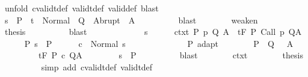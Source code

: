 \begin{isabellebody}
\ {\isacharparenleft}unfold\ cvalidt{\isacharunderscore}def\ validt{\isacharunderscore}def\ valid{\isacharunderscore}def{\isacharparenright}\ blast\isanewline
\ \ \ \ \ \ \isamarkupfalse%
\ {\isachardoublequoteopen}s\ {\isasymin}\ P{\isacharprime}\ {\isasymlongrightarrow}\ t\ {\isasymin}\ Normal\ {\isacharbackquote}\ Q{\isacharprime}\ {\isasymunion}\ Abrupt\ {\isacharbackquote}\ A{\isacharprime}{\isachardoublequoteclose}\isanewline
\ \ \ \ \ \ \ \ \isamarkupfalse%
\ blast\isanewline
\ \ \ \ \ \ \isamarkupfalse%
\ weaken\ \isanewline
\ \ \ \ \ \ \isamarkupfalse%
\ {\isacharquery}thesis\isanewline
\ \ \ \ \ \ \ \ \isamarkupfalse%
\ blast\isanewline
\ \ \ \ \isamarkupfalse%
\isanewline
\ \ \isamarkupfalse%
\isanewline
\ \ \ \ \isamarkupfalse%
\ s\isanewline
\ \ \ \ \isamarkupfalse%
\ ctxt{\isacharcolon}\ {\isachardoublequoteopen}{\isasymforall}{\isacharparenleft}P{\isacharcomma}\ p{\isacharcomma}\ Q{\isacharcomma}\ A{\isacharparenright}{\isasymin}{\isasymTheta}{\isachardot}\ {\isasymGamma}\ {\isasymTurnstile}\isactrlsub t\isactrlbsub {\isacharslash}F\isactrlesub \ P\ {\isacharparenleft}Call\ p{\isacharparenright}\ Q{\isacharcomma}A{\isachardoublequoteclose}\isanewline
\ \ \ \ \isamarkupfalse%
\ P{\isacharcolon}\ {\isachardoublequoteopen}s\ {\isasymin}\ P{\isachardoublequoteclose}\isanewline
\ \ \ \ \isamarkupfalse%
\ {\isachardoublequoteopen}{\isasymGamma}{\isasymturnstile}c\ {\isasymdown}\ Normal\ s{\isachardoublequoteclose}\isanewline
\ \ \ \ \isamarkupfalse%
\ {\isacharminus}\isanewline
\ \ \ \ \ \ \isamarkupfalse%
\ P\ adapt\isanewline
\ \ \ \ \ \ \isamarkupfalse%
\ P{\isacharprime}\ \ Q{\isacharprime}\ \ \ A{\isacharprime}\ \ \isanewline
\ \ \ \ \ \ \ \ {\isachardoublequoteopen}{\isasymGamma}{\isacharcomma}{\isasymTheta}\ {\isasymTurnstile}\isactrlsub t\isactrlbsub {\isacharslash}F\isactrlesub \ P{\isacharprime}\ c\ Q{\isacharprime}{\isacharcomma}A{\isacharprime}{\isachardoublequoteclose}\isanewline
\ \ \ \ \ \ \ \ {\isachardoublequoteopen}s\ {\isasymin}\ P{\isacharprime}{\isachardoublequoteclose}\isanewline
\ \ \ \ \ \ \ \ \isamarkupfalse%
\ blast\isanewline
\ \ \ \ \ \ \isamarkupfalse%
\ ctxt\isanewline
\ \ \ \ \ \ \isamarkupfalse%
\ {\isacharquery}thesis\isanewline
\ \ \ \ \ \ \ \ \isamarkupfalse%
\ {\isacharparenleft}simp\ add{\isacharcolon}\ cvalidt{\isacharunderscore}def\ validt{\isacharunderscore}def{\isacharparenright}\isanewline

\end{isabellebody}
